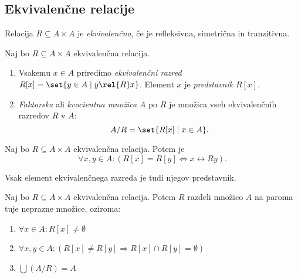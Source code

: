 \documentclass[12pt, a4paper]{article}
\renewcommand{\implies}{\Rightarrow}
\renewcommand{\iff}{\Leftrightarrow}
\begin{document}
\obvs

\newpage

\subsection{Ekvivalenčne relacije}

\begin{okvir}
\begin{definicija}
Relacija $R\subseteq A\times A$ je \emph{ekvivalenčna}, če je refleksivna, simetrična in tranzitivna.
\end{definicija}
\end{okvir}

\begin{definicija}
Naj bo $R\subseteq A\times A$ ekvivalenčna relacija.

\begin{enumerate}
\item Vsakemu $x\in A$ priredimo \emph{ekvivalenčni razred} $R[x]=\set{y\in A\mid y\rel{R}x}$. Element $x$ je \emph{predstavnik} $R[x]$.
\item \emph{Faktorska} ali \emph{kvocientna množica} $A$ po $R$ je množica vseh ekvivalenčnih razredov $R$ v $A$:
\[
A/R=\set{R[x]\mid x\in A}.
\]
\end{enumerate}
\end{definicija}

\begin{lema}
Naj bo $R\subseteq A\times A$ ekvivalenčna relacija. Potem je
\[
\forall x,y\in A\colon(R[x]=R[y]\iff x\rel{R}y).
\]
\end{lema}

\obvs

\begin{posledica}
Vsak element ekvivalenčnega razreda je tudi njegov predstavnik.
\end{posledica}

\begin{izrek}
Naj bo $R\subseteq A\times A$ ekvivalenčna relacija. Potem $R$ razdeli množico $A$ na paroma tuje neprazne množice, oziroma:

\begin{enumerate}
\item $\forall x\in A\colon R[x]\ne\emptyset$
\item $\forall x,y\in A\colon(R[x]\ne R[y]\implies R[x]\cap R[y]=\emptyset)$
\item $\bigcup (A/R)=A$
\end{enumerate}
\end{izrek}
\end{document}
